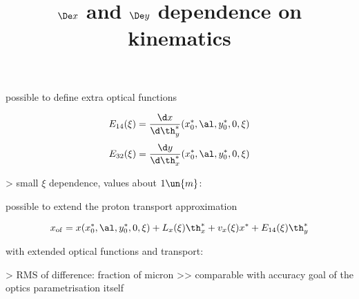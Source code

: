 \vskip-3mm
\> possible to define extra optical functions

\vskip-3mm
\cThird
$$E_{14}(\xi) = {\d x\over\d\th^*_y}(x^*_0, \al, y^*_0, 0, \xi)$$
$$E_{32}(\xi) = {\d y\over\d\th^*_x}(x^*_0, \al, y^*_0, 0, \xi)$$

\>> small $\xi$ dependence, values about $1\un{m}$:

\centerline{}

\vskip-3mm
\> possible to extend the proton transport approximation

\vskip-3mm
\cThird
$$x_{\rm of} = x(x^*_0, \al, y^*_0, 0, \xi) + L_x(\xi) \th^*_x + v_x(\xi) x^* + E_{14}(\xi) \th^*_y$$


\newpage %
\title{$\De x$ and $\De y$ dependence on kinematics}

\> with extended optical functions and transport:

\centerline{}

\>> RMS of difference: fraction of micron
\>>> comparable with accuracy goal of the optics parametrisation itself



\vfil
\bye
